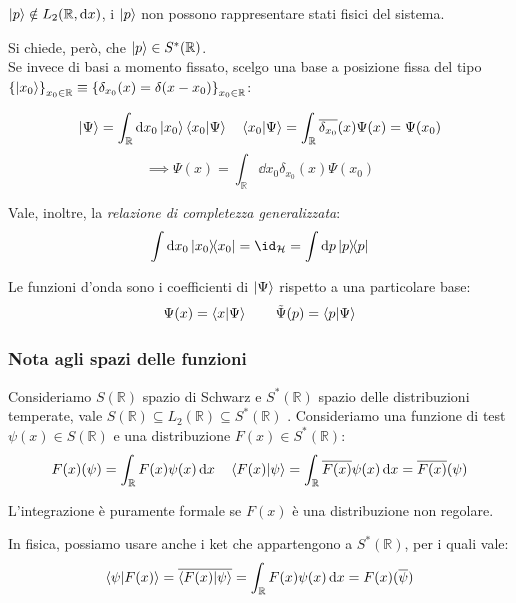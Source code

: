 \begin{attention}
    \(\ket{p} \notin L_2(\mathbb{R},\dd{x})\), i \(\ket{p}\) non possono rappresentare stati fisici del sistema.
\end{attention}

Si chiede, però,  che \(\ket{p} \in S^*(\mathbb{R})\).\\
Se invece di basi a momento fissato, scelgo una base a posizione fissa del tipo 
\(\left\{ \ket{x_0} \right\}_{x_0 \in\mathbb{R}}\equiv \left\{\delta_{x_0}(x)= \delta(x-x_0)\right\}_{x_0 \in \mathbb{R}}\):

\begin{equation*}
    \ket{\Psi}= \int_\mathbb{R}\dd{x_0} \ket{x_0}\braket{x_0}{\Psi} \quad   
    \braket{x_0}{\Psi} = \int_\mathbb{R} \overline{\delta_{x_0}}(x) \Psi(x)= \Psi(x_0)
\end{equation*}
\begin{equation}
    \implies \Psi(x)= \int_\mathbb{R} \dd{x_0} \delta_{x_0}(x)\Psi(x_0)
\end{equation}

Vale, inoltre, la \textit{relazione di completezza generalizzata}: 
\begin{equation}
    \int \dd{x_0} \dyad{x_0}{x_0}= \id_\mathcal{H} = \int \dd{p} \dyad{p}{p}
\end{equation}

Le funzioni d'onda sono i coefficienti di \(\ket{\Psi}\) rispetto a una particolare base:
\begin{equation}
    \Psi(x)= \braket{x}{\Psi} \qquad \tilde{\Psi}(p) = \braket{p}{\Psi}
\end{equation}


\subsubsection{Nota agli spazi delle funzioni}
Consideriamo \(S(\mathbb{R})\) spazio di Schwarz e \(S^*(\mathbb{R})\) spazio delle distribuzioni temperate,
vale \(S(\mathbb{R})\subseteq L_2(\mathbb{R})\subseteq S^*(\mathbb{R})\) .
Consideriamo una funzione di test \(\psi(x) \in S(\mathbb{R})\) e una distribuzione \(F(x) \in S^*(\mathbb{R})\):
\[
    F(x)(\psi) = \int_\mathbb{R} F(x) \psi(x) \dd{x} \quad \braket{F(x)}{\psi} = \int_\mathbb{R}\overline{F(x)} \psi(x) \dd{x} = \overline{F(x)} (\psi)
\]
\begin{attention}
    L'integrazione è puramente formale se \(F(x)\) è una distribuzione non regolare.
\end{attention}
In fisica, possiamo usare anche i ket che appartengono a \(S^*(\mathbb{R})\), per i quali vale:
\[
    \braket{\psi}{F(x)}= \overline{\braket{F(x)}{\psi}} = \int_\mathbb{R} F(x) \psi (x) \dd{x} = F(x) (\overline{\psi})
\]

